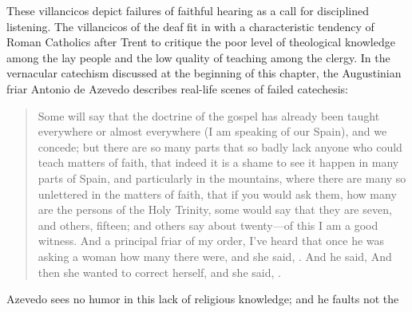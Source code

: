 These villancicos depict failures of faithful hearing as a call for disciplined
listening.
The villancicos of the deaf fit in with a characteristic tendency of Roman
Catholics after Trent to critique the poor level of theological knowledge among
the lay people and the low quality of teaching among the clergy.%
    \Autocite[56--57]{Kamen:EarlyModernSociety}
In the vernacular catechism discussed at the beginning of this chapter, the
Augustinian friar Antonio de Azevedo describes real-life scenes of failed
catechesis: 
\begin{quote}
    Some will say that the doctrine of the gospel has already been taught
    everywhere or almost everywhere (I am speaking of our Spain), and we
    concede; but there are so many parts that so badly lack anyone who could
    teach matters of faith, that indeed it is a shame to see it happen in many
    parts of Spain, and particularly in the mountains, where there are many so
    unlettered  in the matters of faith, that if you would ask
    them, how many are the persons of the Holy Trinity, some would say that they
    are seven, and others, fifteen; and others say about twenty---of this I am a
    good witness.
    And a principal friar of my order, I've heard that once he was asking a
    woman how many  there were, and she said,
    . 
    And he said,  
    And then she wanted to correct herself, and she said, .%
        \Autocite
        [26: .]
        {Azevedo:Catecismo}
\end{quote}
Azevedo sees no humor in this lack of religious knowledge; and he faults not the

